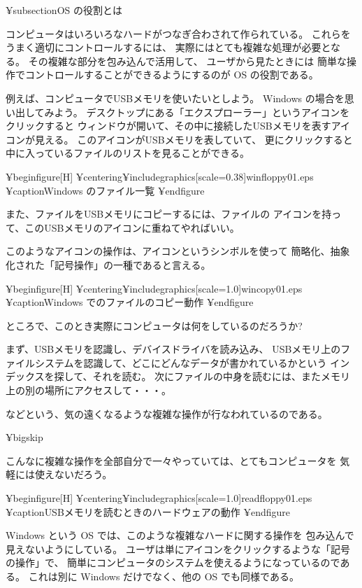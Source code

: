 ¥subsection{OS の役割とは}

コンピュータはいろいろなハードがつなぎ合わされて作られている。
これらをうまく適切にコントロールするには、
実際にはとても複雑な処理が必要となる。
その複雑な部分を包み込んで活用して、
ユーザから見たときには
簡単な操作でコントロールすることができるようにするのが OS の役割である。


例えば、コンピュータでUSBメモリを使いたいとしよう。
 Windows の場合を思い出してみよう。
デスクトップにある「エクスプローラー」というアイコンをクリックすると
ウィンドウが開いて、その中に接続したUSBメモリを表すアイコンが見える。
このアイコンがUSBメモリを表していて、
更にクリックすると中に入っているファイルのリストを見ることができる。


¥begin{figure}[H]
¥centering{¥includegraphics[scale=0.38]{winfloppy01.eps}}
¥caption{Windows のファイル一覧}
¥end{figure}

また、ファイルをUSBメモリにコピーするには、ファイルの
アイコンを持って、このUSBメモリのアイコンに重ねてやればいい。

このようなアイコンの操作は、アイコンというシンボルを使って
簡略化、抽象化された「記号操作」の一種であると言える。

¥begin{figure}[H]
¥centering{¥includegraphics[scale=1.0]{wincopy01.eps}}
¥caption{Windows でのファイルのコピー動作}
¥end{figure}

ところで、このとき実際にコンピュータは何をしているのだろうか?

まず、USBメモリを認識し、デバイスドライバを読み込み、
USBメモリ上のファイルシステムを認識して、どこにどんなデータが書かれているかという
インデックスを探して、それを読む。
次にファイルの中身を読むには、またメモリ上の別の場所にアクセスして・・・。

などという、気の遠くなるような複雑な操作が行なわれているのである。

¥bigskip

こんなに複雑な操作を全部自分で一々やっていては、とてもコンピュータを
気軽には使えないだろう。

¥begin{figure}[H]
¥centering{¥includegraphics[scale=1.0]{readfloppy01.eps}}
¥caption{USBメモリを読むときのハードウェアの動作}
¥end{figure}

 Windows という OS では、このような複雑なハードに関する操作を
包み込んで見えないようにしている。
ユーザは単にアイコンをクリックするような「記号の操作」で、
簡単にコンピュータのシステムを使えるようになっているのである。
これは別に Windows だけでなく、他の OS でも同様である。


